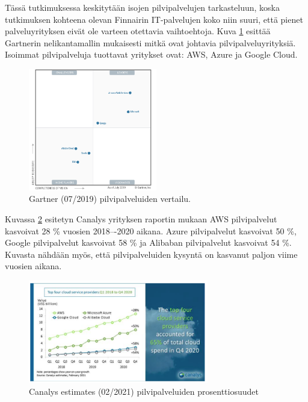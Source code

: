 Tässä tutkimuksessa keskitytään isojen pilvipalvelujen tarkasteluun, koska tutkimuksen kohteena olevan Finnairin IT-palvelujen koko niin suuri, että pienet palveluyrityksen eivät ole varteen otettavia vaihtoehtoja. Kuva \ref{gartner} esittää Gartnerin nelikantamallin mukaisesti mitkä ovat johtavia pilvipalveluyrityksiä. Isoimmat pilvipalveluja tuottavat yritykset ovat: AWS, Azure ja Google Cloud.

\begin{figure}[ht]
\centering 
\includegraphics[width=0.50\textwidth]{figures/CloudIaaS.png}
\caption{Gartner (07/2019) pilvipalveluiden vertailu. \citep{top_cloud}}\label{gartner}
\end{figure}

Kuvassa \ref{canalys} esitetyn Canalys yrityksen raportin mukaan AWS pilvipalvelut kasvoivat 28 \% vuosien 2018–-2020 aikana. Azure pilvipalvelut kasvoivat 50 \%, Google pilvipalvelut kasvoivat 58 \% ja Alibaban pilvipalvelut kasvoivat 54 \%. Kuvasta nähdään myös, että pilvipalveluiden kysyntä on kasvanut paljon viime vuosien aikana.

\begin{figure}[ht]
\centering 
\includegraphics[width=0.70\textwidth]{figures/Canalys.png}
\caption{Canalys estimates (02/2021) pilvipalveluiden prosenttiosuudet \citep{top_cloud}}\label{canalys}
\end{figure}

